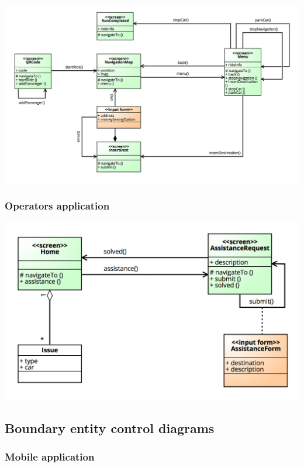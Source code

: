 \documentclass[]{article}
\begin{document}
\centerline{\includegraphics{./images/UX_Car.png}}

\subsubsection{Operators application}\label{operators-application}

\centerline{\includegraphics{./images/UX_Operator.png}}

\subsection{Boundary entity control
diagrams}\label{boundary-entity-control-diagrams}

\subsubsection{Mobile application}\label{mobile-application-2}
\end{document}
